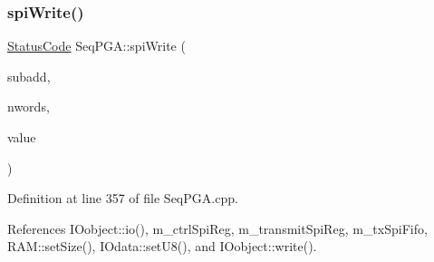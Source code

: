 \subsubsection{\texorpdfstring{spi\+Write()}{spiWrite()}\hspace{0.1cm}{\footnotesize\ttfamily [2/3]}}
{\footnotesize\ttfamily \hyperlink{classStatusCode}{Status\+Code} Seq\+P\+G\+A\+::spi\+Write (\begin{DoxyParamCaption}\item[{unsigned int}]{subadd,  }\item[{unsigned int}]{nwords,  }\item[{Py\+Object $\ast$}]{value }\end{DoxyParamCaption})}



Definition at line 357 of file Seq\+P\+G\+A.\+cpp.



References I\+Oobject\+::io(), m\+\_\+ctrl\+Spi\+Reg, m\+\_\+transmit\+Spi\+Reg, m\+\_\+tx\+Spi\+Fifo, R\+A\+M\+::set\+Size(), I\+Odata\+::set\+U8(), and I\+Oobject\+::write().


